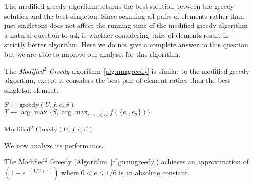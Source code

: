 The modified greedy algorithm returns the best solution between the greedy solution and the best singleton.
Since scanning all pairs of elements rather than just singletons does not affect the running time of the modified greedy algorithm a natural question to ask is whether considering pairs of elements result in strictly better algorithm.
Here we do not give a complete answer to this question but we are able to improve our analysis for this algorithm. 

The \emph{Modified$^2$ Greedy} algorithm~\ref{alg:mmgreedy} 
is similar to the  modified greedy algorithm, 
except it considers the best pair of element rather than the best singleton element.


\begin{algorithm}
	$S \leftarrow \text{greedy}(U, f, c, \beta)$
	\\
	$T \leftarrow \arg\max\{S, \arg\max_{e_1, e_2 \in U}f(\{e_1, e_2\})\}$
	\\
	\caption{Modified$^2$ Greedy$(U, f, c, \beta)$}
	\label{alg:mmgreedy}
\end{algorithm}

We now analyze its performance.

\begin{theorem}
	\label{theorem:mmgreedy}
	The Modified$^2$ Greedy (Algorithm~\ref{alg:mmgreedy}) achieves an approximation of $(1-e^{-(1/2 + \epsilon)})$ where $0 < e \leq 1/6$ is an absolute constant.
\end{theorem}

